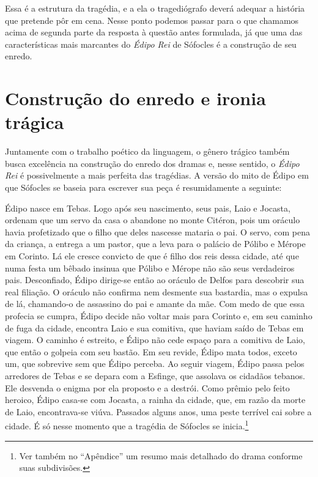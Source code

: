 Essa é a estrutura da tragédia, e a ela o tragediógrafo deverá adequar a
história que pretende pôr em cena. Nesse ponto podemos passar para o que
chamamos acima de segunda parte da resposta à questão antes formulada,
já que uma das características mais marcantes do \emph{Édipo Rei} de
Sófocles é a construção de seu enredo.

\section{Construção do enredo e ironia trágica}

Juntamente com o trabalho poético da linguagem, o gênero trágico
também busca excelência na construção do enredo dos dramas e, nesse
sentido, o \emph{Édipo Rei} é possivelmente a mais perfeita das
tragédias. A versão do mito de Édipo em que Sófocles se baseia para
escrever sua peça é resumidamente a seguinte:

Édipo nasce em Tebas. Logo após seu nascimento, seus pais, Laio e
Jocasta, ordenam que um servo da casa o abandone no monte Citéron, pois
um oráculo havia profetizado que o filho que deles nascesse mataria o
pai. O servo, com pena da criança, a entrega a um pastor, que a leva
para o palácio de Pólibo e Mérope em Corinto. Lá ele cresce convicto de
que é filho dos reis dessa cidade, até que numa festa um bêbado insinua
que Pólibo e Mérope não são seus verdadeiros pais. Desconfiado, Édipo
dirige-se então ao oráculo de Delfos para descobrir sua real filiação. O
oráculo não confirma nem desmente sua bastardia, mas o expulsa de lá,
chamando-o de assassino do pai e amante da mãe. Com medo de que essa
profecia se cumpra, Édipo decide não voltar mais para Corinto e, em seu
caminho de fuga da cidade, encontra Laio e sua comitiva, que haviam
saído de Tebas em viagem. O caminho é estreito, e Édipo não cede espaço
para a comitiva de Laio, que então o golpeia com seu bastão. Em seu
revide, Édipo mata todos, exceto um, que sobrevive sem que Édipo
perceba. Ao seguir viagem, Édipo passa pelos arredores de Tebas e se
depara com a Esfinge, que assolava os cidadãos tebanos. Ele desvenda o
enigma por ela proposto e a destrói. Como prêmio pelo feito heroico,
Édipo casa-se com Jocasta, a rainha da cidade, que, em razão da morte de
Laio, encontrava-se viúva. Passados alguns anos, uma peste terrível cai
sobre a cidade. É só nesse momento que a tragédia de Sófocles se inicia.\footnote{ Ver também no 
``Apêndice'' um resumo mais detalhado do drama conforme suas subdivisões.}

